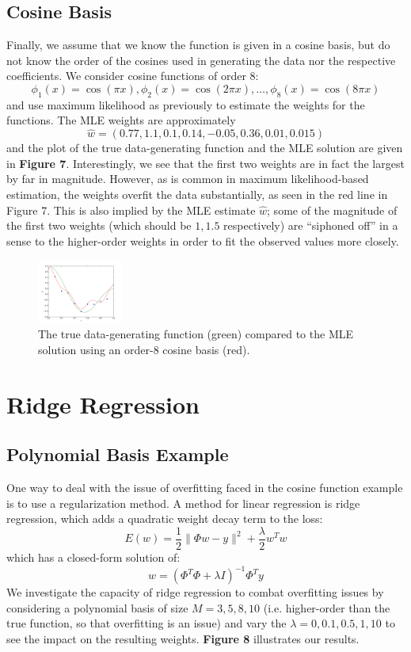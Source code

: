 \documentclass[10pt,psamsfonts]{amsart}
\theoremstyle{definition}
\theoremstyle{remark}
\numberwithin{equation}{section}
\begin{document}
\subsection{Cosine Basis} Finally, we assume that we know the function is given in a cosine basis, but do not know the order of the cosines used in generating the data nor the respective coefficients. We consider cosine functions of order 8:
$$\phi_1(x) = \cos(\pi x), \phi_2(x) = \cos(2\pi x), \dots, \phi_8(x) = \cos(8\pi x)$$
and use maximum likelihood as previously to estimate the weights for the functions. The MLE weights are approximately
$$\hat{w} = (0.77, 1.1, 0.1, 0.14, -0.05, 0.36, 0.01, 0.015)$$
and the plot of the true data-generating function and the MLE solution are given in {\bf Figure 7}. Interestingly, we see that the first two weights are in fact the largest by far in magnitude. However, as is common in maximum likelihood-based estimation, the weights overfit the data substantially, as seen in the red line in Figure 7. This is also implied by the MLE estimate $\hat{w}$; some of the magnitude of the first two weights (which should be $1, 1.5$ respectively) are ``siphoned off'' in a sense to the higher-order weights in order to fit the observed values more closely.

\begin{figure}
	\includegraphics[width=0.25\textwidth]{hw1_2-4.pdf}
	\caption{The true data-generating function (green) compared to the MLE solution using an order-8 cosine basis (red).}
\end{figure}


\section{Ridge Regression}

\subsection{Polynomial Basis Example} One way to deal with the issue of overfitting faced in the cosine function example is to use a regularization method. A method for linear regression is ridge regression, which adds a quadratic weight decay term to the loss:
$$E(w) = \frac{1}{2}\|\Phi w - y\|^2 + \frac{\lambda}{2} w^Tw$$
which has a closed-form solution of:
$$w = (\Phi^T\Phi +\lambda I)^{-1} \Phi^T y$$
We investigate the capacity of ridge regression to combat overfitting issues by considering a polynomial basis of size $M = 3, 5, 8, 10$ (i.e. higher-order than the true function, so that overfitting is an issue) and vary the $\lambda = 0, 0.1, 0.5, 1, 10$ to see the impact on the resulting weights. {\bf Figure 8} illustrates our results.
\end{document}
